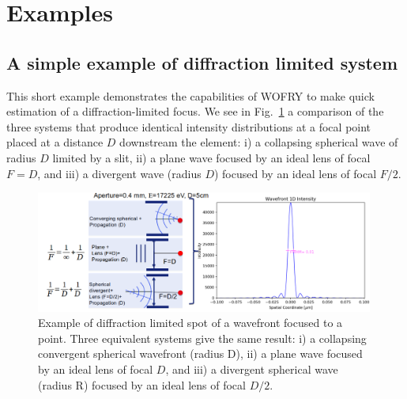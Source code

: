 \documentclass{iopconfser}
\begin{document}


\section{Examples}

\subsection{A simple example of diffraction limited system}
This short example demonstrates the capabilities of WOFRY to make quick estimation of a diffraction-limited focus. We see in Fig.~\ref{fig:diffractionlimited} a comparison of the three systems that produce identical intensity distributions at a focal point placed at a distance $D$ downstream the element: i) a collapsing spherical wave of radius $D$ limited by a slit, ii) a plane wave focused by an ideal lens of focal $F=D$, and iii) a divergent wave (radius $D$) focused by an ideal lens of focal $F/2$.

\begin{figure}[H]
    \centering
    \includegraphics[width=0.99\textwidth]{figures/diffractionlimited.png}
    \caption{Example of diffraction limited spot of a wavefront focused to a point. Three equivalent systems give the same result: i) a collapsing convergent spherical wavefront (radius D), ii) a plane wave focused by an ideal lens of focal $D$, and iii) a divergent spherical wave (radius R) focused by an ideal lens of focal $D/2$.   }\label{fig:diffractionlimited}
\end{figure}
\end{document}
